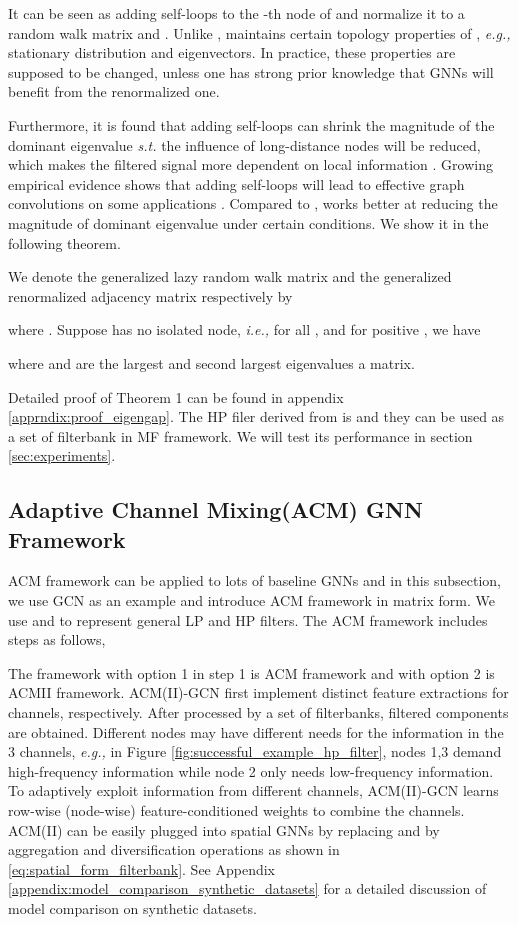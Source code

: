 \documentclass{article}
\newcommand\ie{\textit{i.e.,}}
\newcommand\eg{\textit{e.g.,}}
\newcommand\st{\textit{s.t.}}
\newcommand{\0}{{\boldsymbol{0}}}
\newcommand{\6}{{\partial}}
\newcommand{\8}{{\infty}}
\newcommand{\4}{{\nabla}}
\newenvironment{theorem}[2][Theorem]{\begin{trivlist}
		\item[\hskip \labelsep {\bfseries #1}\hskip \labelsep {\bfseries #2.}]}{\end{trivlist}}
\begin{document}
It can be seen as adding  self-loops to the -th node of  and normalize it to a random walk matrix and . Unlike ,  maintains certain topology properties of , \eg{} stationary distribution and eigenvectors. In practice, these properties are supposed to be changed, unless one has strong prior knowledge that GNNs will benefit from the renormalized one. 

Furthermore, it is found that adding self-loops can shrink the magnitude of the dominant eigenvalue \st{} the influence of long-distance nodes will be reduced, which makes the filtered signal more dependent on local information \cite{hamilton2020graph}. Growing empirical evidence shows that adding self-loops will lead to effective graph convolutions on some applications \cite{klicpera2018predict, wu2019simplifying}. Compared to ,  works better at reducing the magnitude of dominant eigenvalue under certain conditions. We show it in the following theorem.
\begin{theorem} 1
We denote the generalized lazy random walk matrix and  the generalized renormalized adjacency matrix 
respectively by 

where . Suppose  has no isolated node, \ie{}  for all , and for positive , we have

where  and  are the largest and second largest eigenvalues a matrix.
\end{theorem}
Detailed proof of Theorem 1 can be found in appendix \ref{apprndix:proof_eigengap}.
The HP filer derived from  is  and they can be used as a set of filterbank in MF framework. We will test its performance in section \ref{sec:experiments}.
\fi
\subsection{Adaptive Channel Mixing(ACM) GNN  Framework}
\label{sec:acm_gnn_architecture}
ACM framework can be applied to lots of baseline GNNs and in this subsection, we use GCN as an example and introduce ACM framework in matrix form. We use  and  to represent general LP and HP filters. The ACM framework includes  steps as follows,
\vspace*{-1.5mm}

The framework with option 1 in step 1 is ACM framework and with option 2 is ACMII framework. ACM(II)-GCN first implement distinct feature extractions for  channels, respectively. After processed by a set of filterbanks,  filtered components  are obtained. Different nodes may have different needs for the information in the 3 channels, \eg{} in Figure \ref{fig:successful_example_hp_filter}, nodes 1,3 demand high-frequency information while node 2 only needs low-frequency information. To adaptively exploit information from different channels, ACM(II)-GCN learns row-wise (node-wise) feature-conditioned weights to combine the  channels. ACM(II) can be easily plugged into spatial GNNs by replacing  and  by aggregation and diversification operations as shown in \eqref{eq:spatial_form_filterbank}.  See Appendix \ref{appendix:model_comparison_synthetic_datasets} for a detailed discussion of model comparison on synthetic datasets.
\vspace*{-2.5mm}
\end{document}
